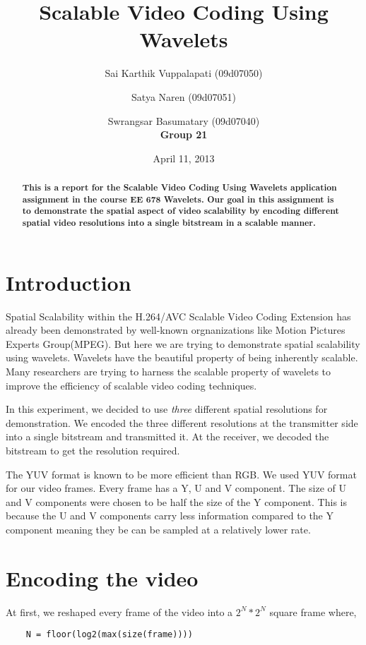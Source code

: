\documentclass[10pt,twocolumn]{article}
\title{Scalable Video Coding Using Wavelets}
\author{Sai Karthik Vuppalapati (09d07050) \\
\and Satya Naren (09d07051) \\
\and Swrangsar Basumatary (09d07040) \\
\textbf{Group 21}}
\date{April 11, 2013}
\begin{document}
\maketitle

\begin{abstract}
    \textbf{This is a report for the Scalable Video Coding Using Wavelets application assignment in the course EE 678 Wavelets. Our goal in this assignment is to demonstrate the spatial aspect of video scalability by encoding different spatial video resolutions into a single bitstream in a scalable manner.}
\end{abstract}

\section{Introduction}

Spatial Scalability within the H.264/AVC Scalable Video Coding Extension has already been demonstrated\cite{segall2007} by well-known orgnanizations like Motion Pictures Experts Group(MPEG). But here we are trying to demonstrate spatial scalability using wavelets\cite{daubechies1990, daubechies1996}. Wavelets have the beautiful property of being inherently scalable. Many researchers are trying to harness the scalable property of wavelets to improve the efficiency of scalable video coding techniques\cite{signoroni2007}.

In this experiment, we decided to use \emph{three} different spatial resolutions for demonstration. We encoded the three different resolutions at the transmitter side into a single bitstream and transmitted it. At the receiver, we decoded the bitstream to get the resolution required.

The YUV format is known to be more efficient than RGB. We used YUV format for our video frames. Every frame has a Y, U and V component. The size of U and V components were chosen to be half the size of the Y component. This is because the U and V components carry less information compared to the Y component meaning they be can be sampled at a relatively lower rate.

\section{Encoding the video}

At first, we reshaped every frame of the video into a $2^N * 2^N$ square frame where,
\begin{verbatim}
    N = floor(log2(max(size(frame))))
\end{verbatim}
\end{document}
